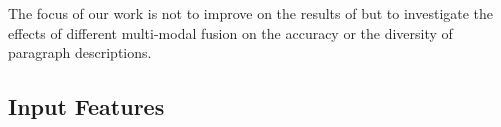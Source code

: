 \documentclass[11pt,a4paper]{article}
\newcommand{\kibitz}[2]{\ifnum\Comments=1\textcolor{#1}{#2}\fi}
\newcommand{\nikolai}[1]{\kibitz{red}  {[Nikolai: #1]}}
\begin{document}
The focus of our work is not to improve on the results of  but to investigate the effects of different multi-modal fusion on the accuracy or the diversity of paragraph descriptions. %




\subsection{Input Features}
\end{document}
